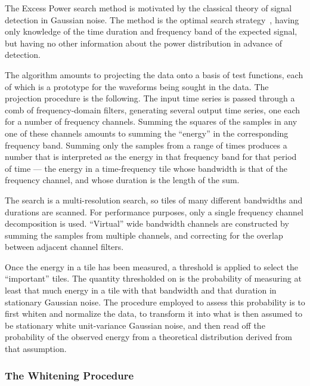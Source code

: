 \documentclass[10pt]{article}
\begin{document}
The Excess Power search method is motivated by the classical theory of
signal detection in Gaussian noise.  The method is the optimal search
strategy~\cite{anderson2001}, having only knowledge of the time duration
and frequency band of the expected signal,  but having no other information
about the power distribution in advance of detection.

The algorithm amounts to projecting the data onto a basis of test
functions, each of which is a prototype for the waveforms being sought in
the data.  The projection procedure is the following.  The input time
series is passed through a comb of frequency-domain filters, generating
several output time series, one each for a number of frequency channels.
Summing the squares of the samples in any one of these channels amounts to
summing the ``energy'' in the corresponding frequency band.  Summing only
the samples from a range of times produces a number that is interpreted as
the energy in that frequency band for that period of time --- the energy in
a time-frequency tile whose bandwidth is that of the frequency channel, and
whose duration is the length of the sum.

The search is a multi-resolution search, so tiles of many different
bandwidths and durations are scanned.  For performance purposes, only a
single frequency channel decomposition is used.  ``Virtual'' wide bandwidth
channels are constructed by summing the samples from multiple channels, and
correcting for the overlap between adjacent channel filters.

Once the energy in a tile has been measured, a threshold is applied to
select the ``important'' tiles.  The quantity thresholded on is the
probability of measuring at least that much energy in a tile with that
bandwidth and that duration in stationary Gaussian noise.  The procedure
employed to assess this probability is to first whiten and normalize the
data, to transform it into what is then assumed to be stationary white
unit-variance Gaussian noise, and then read off the probability of the
observed energy from a theoretical distribution derived from that
assumption.


\subsubsection{The Whitening Procedure}
\end{document}

